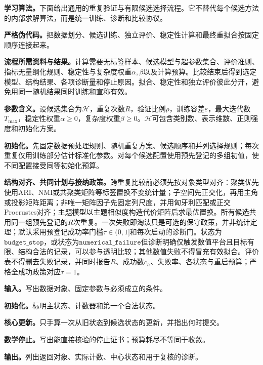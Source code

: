 \label{struct:V4-C01-CH10}
\textbf{学习算法。}下面给出通用的重复验证与有限候选选择流程。它不替代每个候选方法的内部求解算法，而是统一训练、诊断和比较协议。

\label{struct:V4-C01-CH19}
\textbf{严格伪代码。}把数据划分、候选训练、独立评价、稳定性计算和最终重拟合按固定顺序连接起来。

\label{struct:V4-C01-CH20}
\textbf{流程所需资料与结果。}计算需要无标签样本、候选模型与超参数集合、评价准则、指标无量纲化规则、稳定性与复杂度权重$\alpha,\beta$以及计算预算。比较结束后得到选定模型、结构结果、各项诊断量和停止原因。拟合、稳定性和独立评价彼此分开，避免用同一随机结果同时训练和宣称有效。

\label{struct:V4-C01-CH21}
\textbf{参数含义。}设候选集合为$\mathcal H$，重复次数$R$，验证比例$\rho$，训练容差$\varepsilon$，最大迭代数$T_{\max}$，稳定性权重$\alpha\geq0$，复杂度权重$\beta\geq0$。$\mathcal H$可包含类别数、表示维数、正则强度和初始化方案。

\label{struct:V4-C01-CH22}
\textbf{初始化。}先固定数据预处理规则、随机重复方案、候选顺序和并列选择规则；每次重复仅用训练部分估计标准化参数。对每个候选配置使用预先登记的多组初值，使不同配置接受同等初始化预算。

\begin{warningbox}
\textbf{结构对齐、共同计划与接纳政策。}跨重复比较前必须先按对象类型对齐：聚类优先使用ARI、NMI或共聚类矩阵等标签置换不变统计量；子空间先正交化，再用主角或投影矩阵距离；非唯一矩阵因子先固定列尺度，并用匈牙利匹配或正交Procrustes对齐；主题模型以主题相似度构造代价矩阵后求最优置换。所有候选共用同一组预先登记的$R$次重复。一次失败即淘汰只是可选的保守政策，并非统计定理；默认采用预登记成功率门槛$\tau\in(0,1]$和每次启动的诊断门。状态为$\mathtt{budget\_stop}$，或状态为$\mathtt{numerical\_failure}$但诊断明确仅触发数值平台且目标有限、结构合法的记录，可以参与透明比较；其他数值失败不得冒充有效拟合。评价表不得删去失败记录，并同时报告$R$、成功数$c_h$、失败率、各状态与重启预算；严格全成功政策对应$\tau=1$。
\end{warningbox}

\begin{keypointbox}[title={无监督模型的重复验证与选择：五步阅读}]
\textbf{输入。}写出数据对象、固定参数与必须成立的条件。\par
\textbf{初始化。}标明主状态、计数器和第一个合法状态。\par
\textbf{核心更新。}只手算一次从旧状态到候选状态的更新，并指出何时提交。\par
\textbf{数学停止。}写出能直接核验的停止证书；预算耗尽不等同于收敛。\par
\textbf{输出。}列出返回对象、实际计数、中心状态和用于复核的诊断。
\end{keypointbox}
